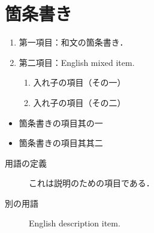 \documentclass[pdflatex]{jlreq}
\begin{document}
\section{箇条書き}
\begin{enumerate}
\item 第一項目：和文の箇条書き．
\item 第二項目：English mixed item.
\begin{enumerate}
\item 入れ子の項目（その一）
\item 入れ子の項目（その二）
\end{enumerate}
\end{enumerate}
\begin{itemize}
\item 箇条書きの項目其の一
\item 箇条書きの項目其其二
\end{itemize}
\begin{description}
\item[用語の定義] これは説明のための項目である．
\item[別の用語] English description item.
\end{description}
\end{document}
